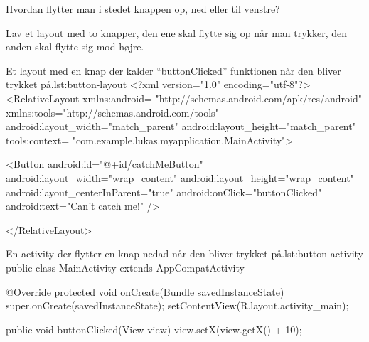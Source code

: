 \begin{exercise}
	Hvordan flytter man i stedet knappen op, ned eller til venstre?
\end{exercise}

\begin{exercise}
	Lav et layout med to knapper, den ene skal flytte sig op når man trykker, 
	den anden skal flytte sig mod højre.
\end{exercise}

\clearpage


\begin{XmlCode}{Et layout med en knap der kalder ``buttonClicked'' funktionen %
når den bliver trykket på.}{lst:button-layout}
	<?xml version="1.0" encoding="utf-8"?>
	<RelativeLayout 
		xmlns:android=
			"http://schemas.android.com/apk/res/android"
		xmlns:tools="http://schemas.android.com/tools"
		android:layout_width="match_parent"
		android:layout_height="match_parent"
		tools:context=
			"com.example.lukas.myapplication.MainActivity">
	
	<Button
		android:id="@+id/catchMeButton"
		android:layout_width="wrap_content"
		android:layout_height="wrap_content"
		android:layout_centerInParent="true"
		android:onClick="buttonClicked"
		android:text="Can't catch me!" />
		
	</RelativeLayout>
\end{XmlCode}

\clearpage

\begin{JavaCode}{En activity der flytter en knap nedad når den bliver trykket %
på.}{lst:button-activity}
	public class MainActivity extends AppCompatActivity {
		
		@Override
		protected void onCreate(Bundle savedInstanceState) {
			super.onCreate(savedInstanceState);
			setContentView(R.layout.activity_main);
		}
		
		
		public void buttonClicked(View view) {
			view.setX(view.getX() + 10);
		}
	}
\end{JavaCode}


